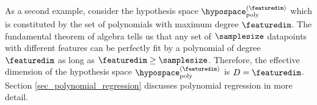 \documentclass[12pt]{report}
\newcommand{\sizehypospace}{D}
\begin{document}
As a second example, consider the hypothesis space 
$\hypospace_{\rm poly}^{(\featuredim)}$ which is constituted 
by the set of polynomials with maximum degree $\featuredim$. 
The fundamental theorem of algebra tells us that any set 
of $\samplesize$ datapoints with different features can 
be perfectly fit by a polynomial of degree $\featuredim$ 
as long as $\featuredim \geq \samplesize$. Therefore, the 
effective dimension of the hypothesis space $\hypospace_{\rm poly}^{(\featuredim)}$ 
is $\sizehypospace=\featuredim$. Section \ref{sec_polynomial_regression} 
discusses polynomial regression in more detail. 



%
%
\end{document}
